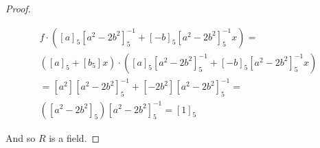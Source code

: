 \documentclass[12pt]{article}
\newenvironment{ex}[2][Exercise]{\begin{trivlist}
\item[\hskip \labelsep {\bfseries #1}\hskip \labelsep {\bfseries #2.}]}{\end{trivlist}}
\begin{document}
\begin{ex}{2}
\begin{enumerate}[label=(\alph*)]
\begin{proof}
\begin{enumerate}
\begin{equation}
                        \begin{aligned}
                            f \cdot ([a]_5[a^2 - 2b^2]_5^{-1} + [-b]_5[a^2 - 2b^2]_5^{-1}x) = \\
                            ([a]_5 + [b_5]x) \cdot ([a]_5[a^2 - 2b^2]_5^{-1} + [-b]_5[a^2 - 2b^2]_5^{-1}x) \\
                            = [a^2][a^2 - 2b^2]_5^{-1} + [-2b^2][a^2 - 2b^2]_5^{-1} = \\
                            ([a^2 - 2b^2]_5)[a^2 - 2b^2]_5^{-1} = [1]_5
                        \end{aligned}
                    \end{equation}
                \end{enumerate}
                And so $R$ is a field.
            \end{proof}
    \end{enumerate}
\end{ex}
\end{document}
